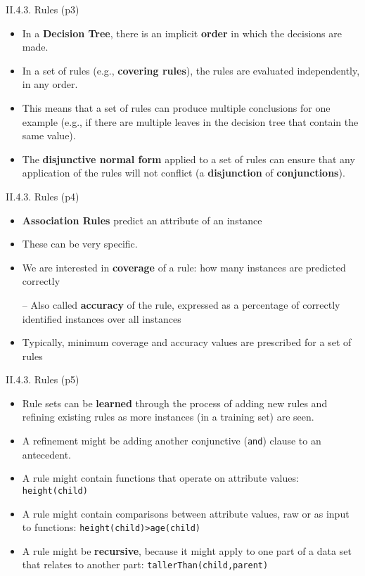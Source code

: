 \documentclass[handout]{beamer}
\newcommand{\strong}[1]{\textbf{\color{teal} #1}}
\begin{document}
\begin{frame}{II.4.3. Rules (p3)}
\begin{itemize}
\item In a \strong{Decision Tree}, there is an implicit \strong{order} in which the decisions are made.
\item[]
\item In a set of rules (e.g., \strong{covering rules}), the rules are evaluated independently, in any order.
\item This means that a set of rules can produce multiple conclusions for one example (e.g., if there are multiple leaves in the decision tree that contain the same value).
\item[]
\item The \strong{disjunctive normal form} applied to a set of rules can ensure that any application of the rules will not conflict (a \strong{disjunction} of \strong{conjunctions}).
\end{itemize}
\end{frame}
\begin{frame}{II.4.3. Rules (p4)}
\begin{itemize}
\item \strong{Association Rules} predict an attribute of an instance 
\item These can be very specific.
\item[]
\item We are interested in \strong{coverage} of a rule: how many instances are predicted correctly
\item[--] Also called \strong{accuracy} of the rule, expressed as a percentage of correctly identified instances over all instances
\item[]
\item Typically, minimum coverage and accuracy values are prescribed for a set of rules
\end{itemize}
\end{frame}
\begin{frame}[fragile]{II.4.3. Rules (p5)}
\begin{itemize}
\item Rule sets can be \strong{learned} through the process of adding new rules and refining existing rules as more instances (in a training set) are seen.
\item A refinement might be adding another conjunctive (\lstinline+and+) clause to an antecedent.
%
\item A rule might contain functions that operate on attribute values:
\lstinline+height(child)+
%
\item A rule might contain comparisons between attribute values, raw or as input to functions:
\lstinline+height(child)>age(child)+
%
\item A rule might be \strong{recursive}, because it might apply to one part of a data set that relates to another part:
\lstinline+tallerThan(child,parent)+
%
\end{itemize}
\end{frame}
\end{document}
